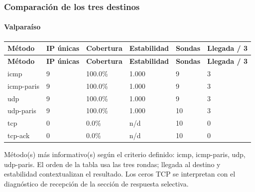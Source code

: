 \subsubsection{Comparación de los tres destinos}
\paragraph{Valparaíso}
\begingroup
\fontsize{9}{11}\selectfont
\addtocounter{table}{-1}
\begin{longtable}{p{3.1cm}p{1.9cm}p{2.1cm}p{2.1cm}p{1.8cm}p{2.1cm}}
\toprule
\textbf{Método} & \textbf{IP únicas} & \textbf{Cobertura} & \textbf{Estabilidad} & \textbf{Sondas} & \textbf{Llegada / 3} \\ \midrule
\endfirsthead
\toprule
\textbf{Método} & \textbf{IP únicas} & \textbf{Cobertura} & \textbf{Estabilidad} & \textbf{Sondas} & \textbf{Llegada / 3} \\ \midrule
\endhead
icmp & 9 & 100.0\% & 1.000 & 9 & 3 \\
icmp-paris & 9 & 100.0\% & 1.000 & 9 & 3 \\
udp & 9 & 100.0\% & 1.000 & 9 & 3 \\
udp-paris & 9 & 100.0\% & 1.000 & 10 & 3 \\
tcp & 0 & 0.0\% & n/d & 10 & 0 \\
tcp-ack & 0 & 0.0\% & n/d & 10 & 0 \\
\bottomrule
\end{longtable}
\endgroup
Método(s) más informativo(s) según el criterio definido: icmp, icmp-paris, udp, udp-paris. El orden de la tabla usa las tres rondas; llegada al destino y estabilidad contextualizan el resultado. Los ceros TCP se interpretan con el diagnóstico de recepción de la sección de respuesta selectiva.

